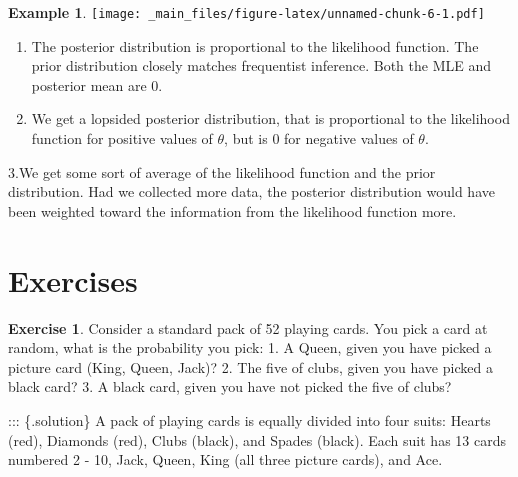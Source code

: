 \documentclass[
]{book}
\theoremstyle{definition}
\theoremstyle{definition}
\newtheorem{example}{Example}[chapter]
\theoremstyle{definition}
\newtheorem{exercise}{Exercise}[chapter]
\theoremstyle{definition}
\theoremstyle{remark}
\begin{document}
\begin{example}
\texttt{[image: \_main\_files/figure-latex/unnamed-chunk-6-1.pdf]}

\begin{enumerate}
\def\labelenumi{\arabic{enumi}.}
\item
  The posterior distribution is proportional to the likelihood function. The prior distribution closely matches frequentist inference. Both the MLE and posterior mean are 0.
\item
  We get a lopsided posterior distribution, that is proportional to the likelihood function for positive values of \(\theta\), but is 0 for negative values of \(\theta\).
\end{enumerate}

3.We get some sort of average of the likelihood function and the prior distribution. Had we collected more data, the posterior distribution would have been weighted toward the information from the likelihood function more.
\end{example}

\hypertarget{exercises}{%
\section{Exercises}\label{exercises}}

\begin{exercise}
Consider a standard pack of 52 playing cards. You pick a card at random, what is the probability you pick:
1. A Queen, given you have picked a picture card (King, Queen, Jack)?
2. The five of clubs, given you have picked a black card?
3. A black card, given you have not picked the five of clubs?
\end{exercise}

::: \{.solution\}
A pack of playing cards is equally divided into four suits: Hearts (red), Diamonds (red), Clubs (black), and Spades (black). Each suit has 13 cards numbered 2 - 10, Jack, Queen, King (all three picture cards), and Ace.
\end{document}
